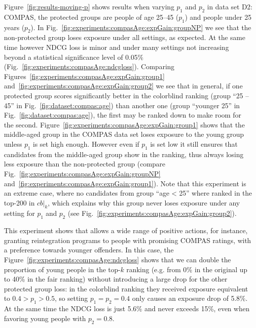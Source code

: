 Figure~\ref{fig:results-moving-p} shows results when varying $p_1$ and $p_2$ in data set D2: COMPAS, the protected groups are people of age 25--45 ($p_1$) and people under 25 years ($p_2$).
%
In Fig.~\ref{fig:experiments:compasAge:expGain:groupNP} we see that the non-protected group loses exposure under all settings, as expected.
%
At the same time however NDCG loss is minor and under many settings not increasing beyond a statistical significance level of 0.05\% (Fig.~\ref{fig:experiments:compasAge:ndcgloss}).
%
Comparing Figures~\ref{fig:experiments:compasAge:expGain:group1} and~\ref{fig:experiments:compasAge:expGain:group2} we see that in general, if one protected group scores significantly better in the colorblind ranking (group ``25 -- 45'' in Fig.~\ref{fig:dataset:compas:age}) than another one (group ``younger 25'' in Fig.~\ref{fig:dataset:compas:age}), the first may be ranked down to make room for the second.
%
Figure~\ref{fig:experiments:compasAge:expGain:group1} shows that the middle-aged group in the COMPAS data set loses exposure to the young group unless $p_1$ is set high enough.
%
However even if $p_1$ is set low it still ensures that candidates from the middle-aged group show in the ranking, thus always losing less exposure than the non-protected group (compare Fig.~\ref{fig:experiments:compasAge:expGain:groupNP} and~\ref{fig:experiments:compasAge:expGain:group1}).
%
Note that this experiment is an extreme case, where no candidates from group ``age < 25'' where ranked in the top-200 in $cb|_k$, which explains why this group never loses exposure under any setting for $p_1$ and $p_2$ (see Fig.~\ref{fig:experiments:compasAge:expGain:group2}).

This experiment shows that \algoFAIR allows a wide range of positive actions, for instance, granting reintegration programs to people with promising COMPAS ratings, with a preference towards younger offenders.
%
In this case, the Figure~\ref{fig:experiments:compasAge:ndcgloss} shows that we can double the proportion of young people in the top-$k$ ranking (e.g. from 0\% in the original up to 40\% in the fair ranking) without introducing a large drop for the other protected group loss: in the colorblind ranking they received exposure equivalent to $0.4 > p_1 > 0.5$, so setting $p_1 = p_2 = 0.4$ only causes an exposure drop of 5.8\%.
%
At the same time the NDCG loss is just 5.6\% and never exceeds 15\%, even when favoring young people with $p_2=0.8$.
